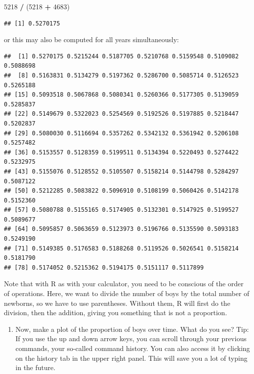 \documentclass[]{article}
\newenvironment{Shaded}{\begin{snugshade}}{\end{snugshade}}
\newcommand{\DecValTok}[1]{\textcolor[rgb]{0.00,0.00,0.81}{#1}}
\newcommand{\StringTok}[1]{\textcolor[rgb]{0.31,0.60,0.02}{#1}}
\newcommand{\OperatorTok}[1]{\textcolor[rgb]{0.81,0.36,0.00}{\textbf{#1}}}
\newcommand{\NormalTok}[1]{#1}
\providecommand{\tightlist}{%
  \setlength{\itemsep}{0pt}\setlength{\parskip}{0pt}}
\begin{document}
\begin{Shaded}
\begin{Highlighting}[]
\DecValTok{5218} \OperatorTok{/}\StringTok{ }\NormalTok{(}\DecValTok{5218} \OperatorTok{+}\StringTok{ }\DecValTok{4683}\NormalTok{)}
\end{Highlighting}
\end{Shaded}

\begin{verbatim}
## [1] 0.5270175
\end{verbatim}

or this may also be computed for all years simultaneously:

\begin{Shaded}
\end{Shaded}

\begin{verbatim}
##  [1] 0.5270175 0.5215244 0.5187705 0.5210768 0.5159548 0.5109082 0.5088698
##  [8] 0.5163831 0.5134279 0.5197362 0.5286700 0.5085714 0.5126523 0.5265188
## [15] 0.5093518 0.5067868 0.5080341 0.5260366 0.5177305 0.5139059 0.5285837
## [22] 0.5149679 0.5322023 0.5254569 0.5192526 0.5197885 0.5218447 0.5202837
## [29] 0.5080030 0.5116694 0.5357262 0.5342132 0.5361942 0.5206108 0.5257482
## [36] 0.5153557 0.5128359 0.5199511 0.5134394 0.5220493 0.5274422 0.5232975
## [43] 0.5155076 0.5128552 0.5105507 0.5158214 0.5144798 0.5284297 0.5087122
## [50] 0.5212285 0.5083822 0.5096910 0.5108199 0.5060426 0.5142178 0.5152360
## [57] 0.5080788 0.5155165 0.5174905 0.5132301 0.5147925 0.5199527 0.5089677
## [64] 0.5095857 0.5063659 0.5123973 0.5196766 0.5135590 0.5093183 0.5249190
## [71] 0.5149385 0.5176583 0.5188268 0.5119526 0.5026541 0.5158214 0.5181790
## [78] 0.5174052 0.5215362 0.5194175 0.5151117 0.5117899
\end{verbatim}

Note that with R as with your calculator, you need to be conscious of
the order of operations. Here, we want to divide the number of boys by
the total number of newborns, so we have to use parentheses. Without
them, R will first do the division, then the addition, giving you
something that is not a proportion.

\begin{enumerate}
\def\labelenumi{\arabic{enumi}.}
\setcounter{enumi}{2}
\tightlist
\item
  Now, make a plot of the proportion of boys over time. What do you see?
  Tip: If you use the up and down arrow keys, you can scroll through
  your previous commands, your so-called command history. You can also
  access it by clicking on the history tab in the upper right panel.
  This will save you a lot of typing in the future.
\end{enumerate}
\end{document}
